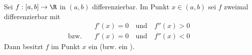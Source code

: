 Sei $f: [a, b] \to \R$ in $(a, b)$ differenzierbar. Im Punkt $x \in (a, b)$ sei $f$ zweimal differenzierbar mit
\begin{align*}
    & f'(x) = 0 \quad \text{und} \quad f''(x) > 0 \\
    \text{bzw.} \quad & f'(x) = 0 \quad \text{und} \quad f''(x) < 0
\end{align*}
Dann besitzt $f$ im Punkt $x$ ein  (bzw. ein ).